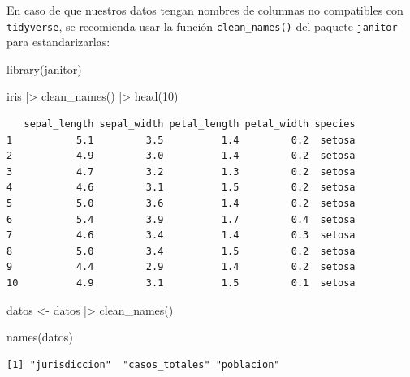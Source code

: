 \documentclass[
  spanish,
  a4paper,
]{scrbook}
\newenvironment{Shaded}{\begin{snugshade}}{\end{snugshade}}
\newcommand{\DecValTok}[1]{\textcolor[rgb]{0.68,0.00,0.00}{#1}}
\newcommand{\FunctionTok}[1]{\textcolor[rgb]{0.28,0.35,0.67}{#1}}
\newcommand{\NormalTok}[1]{\textcolor[rgb]{0.00,0.23,0.31}{#1}}
\newcommand{\OtherTok}[1]{\textcolor[rgb]{0.00,0.23,0.31}{#1}}
\newcommand{\SpecialCharTok}[1]{\textcolor[rgb]{0.37,0.37,0.37}{#1}}
\begin{document}
En caso de que nuestros datos tengan nombres de columnas no compatibles
con \texttt{tidyverse}, se recomienda usar la función
\texttt{clean\_names()} del paquete \texttt{janitor} para
estandarizarlas:

\begin{Shaded}
\begin{Highlighting}[]
\FunctionTok{library}\NormalTok{(janitor)}

\NormalTok{iris }\SpecialCharTok{|\textgreater{}}
  \FunctionTok{clean\_names}\NormalTok{() }\SpecialCharTok{|\textgreater{}}
  \FunctionTok{head}\NormalTok{(}\DecValTok{10}\NormalTok{)}
\end{Highlighting}
\end{Shaded}

\begin{verbatim}
   sepal_length sepal_width petal_length petal_width species
1           5.1         3.5          1.4         0.2  setosa
2           4.9         3.0          1.4         0.2  setosa
3           4.7         3.2          1.3         0.2  setosa
4           4.6         3.1          1.5         0.2  setosa
5           5.0         3.6          1.4         0.2  setosa
6           5.4         3.9          1.7         0.4  setosa
7           4.6         3.4          1.4         0.3  setosa
8           5.0         3.4          1.5         0.2  setosa
9           4.4         2.9          1.4         0.2  setosa
10          4.9         3.1          1.5         0.1  setosa
\end{verbatim}

\begin{Shaded}
\begin{Highlighting}[]
\NormalTok{datos }\OtherTok{\textless{}{-}}\NormalTok{ datos }\SpecialCharTok{|\textgreater{}}
  \FunctionTok{clean\_names}\NormalTok{()}

\FunctionTok{names}\NormalTok{(datos)}
\end{Highlighting}
\end{Shaded}

\begin{verbatim}
[1] "jurisdiccion"  "casos_totales" "poblacion"    
\end{verbatim}
\end{document}
